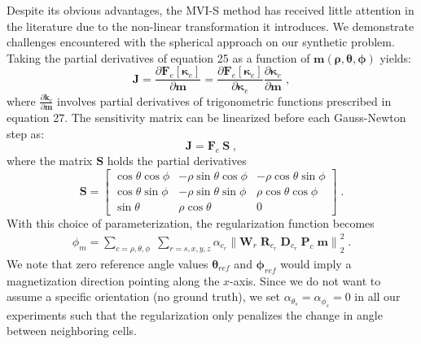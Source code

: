 \documentclass[paper]{geophysics}
\begin{document}
Despite its obvious advantages, the MVI-S method has received little attention in the literature due to the non-linear transformation it introduces.
We demonstrate challenges encountered with the spherical approach on our synthetic problem.
Taking the partial derivatives of equation 25 as a function of $\mathbf{m}( \boldsymbol{\rho}, \boldsymbol{\theta}, \boldsymbol{\phi})$ yields:
\begin{equation} \label{eq:spherical}
\mathbf{J} = \frac{\partial \mathbf{F}_{e}[\boldsymbol{\kappa}_e]}{\partial \mathbf{m}} = \frac{\partial \mathbf{F}_{e}[\boldsymbol{\kappa}_e]}{\partial \boldsymbol{\kappa}_e} \frac{\partial \boldsymbol{\kappa}_e}{\partial \mathbf{m}}\;,
\end{equation}
where $\frac{\partial \mathbf{k}_e}{\partial \mathbf{m}}$ involves partial derivatives of trigonometric functions prescribed in equation 27.
The sensitivity matrix can be linearized before each Gauss-Newton step as:
\begin{equation} \label{eq:lin_sph}
\mathbf{J} = \mathbf{F}_{e}\: \mathbf{S}\;,
\end{equation}
where the matrix $\mathbf{S}$ holds the partial derivatives
\begin{equation} \label{eq:Smatrix}
\mathbf{S} = \begin{bmatrix} \cos{\theta}\cos{\phi} & -\rho\sin{\theta}\cos{\phi} & -\rho\cos{\theta}\sin{\phi} \\
\cos{\theta}\sin{\phi} & -\rho\sin{\theta}\sin{\phi} & \rho\cos{\theta}\cos{\phi} \\
\sin{\theta} & \rho\cos{\theta} & 0 \end{bmatrix}\;.
\end{equation}
With this choice of parameterization, the regularization function becomes
\begin{equation} \label{phi_m_sparse_Spherical}
\begin{split}
\phi_m = \sum_{c = \rho,\theta,\phi} \;
\sum_{r = s,x,y,z} \alpha_{c_r} {\|\mathbf{W}_r \;\mathbf{R}_{c_r} \; \mathbf{D}_{c_r} \;\mathbf{P}_{c} \; \mathbf{m}\|}^2_2 \;.
\end{split}
\end{equation}
We note that zero reference angle values $\boldsymbol \theta_{ref}$ and $\boldsymbol \phi_{ref}$ would imply a magnetization direction pointing along the $x$-axis. Since we do not want to assume a specific orientation (no ground truth), we set $\alpha_{\theta_s}=\alpha_{\phi_s} = 0$ in all our experiments such that the regularization only penalizes the change in angle between neighboring cells.
\end{document}

